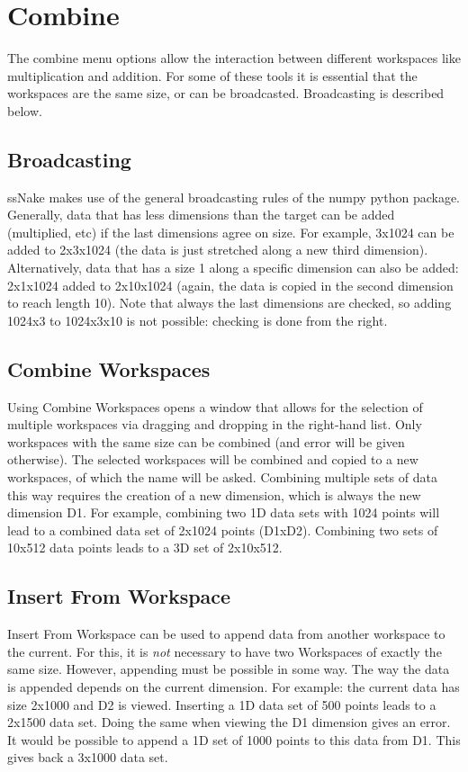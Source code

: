 \documentclass[11pt,a4paper]{article}
\begin{document}
\section{Combine}
The combine menu options allow the interaction between different workspaces like multiplication and addition. For some of these tools it is essential that the workspaces
are the same size, or can be broadcasted. Broadcasting is described below.

\subsection{Broadcasting}
ssNake makes use of the general broadcasting rules of the numpy python package. Generally, data that has less dimensions than the target can be added (multiplied, etc)
if the last dimensions agree on size. For example, 3x1024 can be added to 2x3x1024 (the data is just stretched along a new third dimension). Alternatively, data that has a size 1
along a specific dimension can also be added: 2x1x1024 added to 2x10x1024 (again, the data is copied in the second dimension to reach length 10).
Note that always the last dimensions are checked, so adding 1024x3 to 1024x3x10 is not possible: checking is done from the right. 

\subsection{Combine Workspaces}
Using Combine Workspaces opens a window that allows for the selection of multiple workspaces via dragging and dropping in the right-hand list.
Only workspaces with the same size can be combined (and error will be given otherwise). The selected workspaces will be combined and copied to a new workspaces, of which the name will be asked.
Combining multiple sets of data this way requires the creation of a new dimension, which is always the new dimension D1. For example, combining two 1D data sets with 1024 points will
lead to a combined data set of 2x1024 points (D1xD2). Combining two sets of 10x512 data points leads to a 3D set of 2x10x512.


\subsection{Insert From Workspace}
Insert From Workspace can be used to append data from another workspace to the current. For this, it is \textit{not} necessary to have two Workspaces of exactly the same size.
However, appending must be possible in some way. The way the data is appended depends on the current dimension. For example: the current data has size 2x1000 and D2 is viewed. 
Inserting a 1D data set of 500 points leads to a 2x1500 data set. Doing the same when viewing the D1 dimension gives an error. It would be possible to append a 1D set of 1000
points to this data from D1. This gives back a 3x1000 data set.
\end{document}
